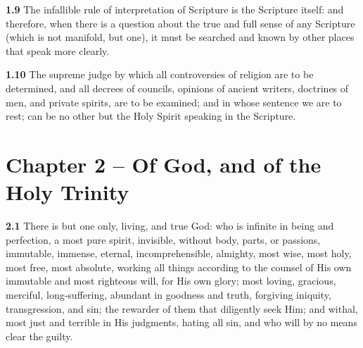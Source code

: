 \par\textbf{1.9} The infallible rule of interpretation of Scripture is the Scripture itself: and therefore, when there is a question about the true and full sense of any Scripture (which is not manifold, but one), it must be searched and known by other places that speak more clearly.   

\par\textbf{1.10} The supreme judge by which all controversies of religion are to be determined, and all decrees of councils, opinions of ancient writers, doctrines of men, and private spirits, are to be examined; and in whose sentence we are to rest; can be no other but the Holy Spirit speaking in the Scripture.  

\section{Chapter 2 -- Of God, and of the Holy Trinity} 

\par\textbf{2.1} There is but one only, living, and true God: who is infinite in being and perfection, a most pure spirit, invisible, without body, parts, or passions, immutable, immense, eternal, incomprehensible, almighty, most wise, most holy, most free, most absolute, working all things according to the counsel of His own immutable and most righteous will, for His own glory; most loving, gracious, merciful, long-suffering, abundant in goodness and truth, forgiving iniquity, transgression, and sin; the rewarder of them that diligently seek Him; and withal, most just and terrible in His judgments, hating all sin, and who will by no means clear the guilty.    


